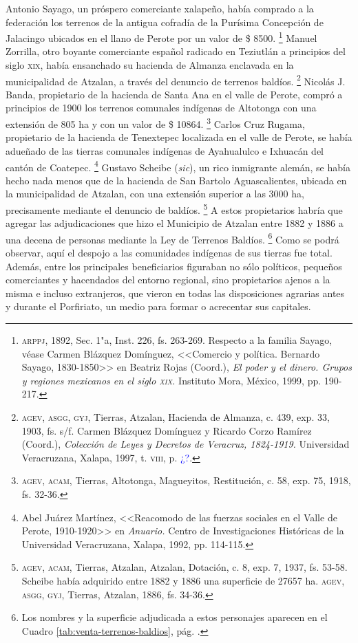 \documentclass[14pt,twoside,final]{extbook} %
\let\oldfootnote\footnote
\renewcommand\footnote[1]{%
\oldfootnote{\hspace{1mm}#1}}
\begin{document}
Antonio Sayago, un próspero comerciante xalapeño, había comprado a la federación los terrenos de la antigua cofradía de la Purísima Concepción de Jalacingo ubicados en el llano de Perote por un valor de \$ 8500.\footnote{\textsc{arppj}, 1892, Sec. 1"a, Inst. 226, fs. 263-269. Respecto a la familia Sayago, véase Carmen Blázquez Domínguez, <<Comercio y política. Bernardo Sayago, 1830-1850>> en Beatriz Rojas (Coord.), \emph{El poder y el dinero. Grupos y regiones mexicanos en el siglo \textsc{xix}.} Instituto Mora, México, 1999, pp. 190-217.} Manuel Zorrilla, otro
boyante comerciante español radicado en Teziutlán a principios del siglo \textsc{xix}, había ensanchado su hacienda de Almanza enclavada en la municipalidad de Atzalan, a través del denuncio de terrenos baldíos.\footnote{\textsc{agev, asgg, gyj}, Tierras, Atzalan, Hacienda de Almanza, c. 439, exp. 33, 1903, fs. s/f. Carmen Blázquez Domínguez y Ricardo Corzo Ramírez (Coord.), \emph{Colección de Leyes y Decretos de Veracruz, 1824-1919.} Universidad Veracruzana, Xalapa, 1997, t. \textsc{viii}, p. \textcolor{blue}{¿?}.} Nicolás J. Banda, propietario de la hacienda de Santa Ana en el valle de Perote, compró a principios de 1900 los terrenos comunales indígenas de Altotonga con una extensión de 805 ha y con un valor de \$ 10864.\footnote{\textsc{agev, acam}, Tierras, Altotonga, Magueyitos, Restitución, c. 58, exp. 75, 1918, fs. 32-36.} Carlos Cruz Rugama, propietario de la hacienda de Tenextepec localizada en el valle de Perote, se había adueñado de las tierras comunales indígenas de Ayahualulco e Ixhuacán del cantón de Coatepec.\footnote{Abel Juárez Martínez, <<Reacomodo de las fuerzas sociales en el Valle de Perote, 1910-1920>> en \textit{Anuario.} Centro de Investigaciones Históricas de la Universidad Veracruzana, Xalapa, 1992, pp. 114-115.} Gustavo Scheibe (\emph{sic}), un rico inmigrante alemán, se había hecho nada menos que de la hacienda de San Bartolo Aguascalientes, ubicada en la municipalidad de Atzalan, con una extensión superior a las 3000 ha, precisamente mediante el denuncio de baldíos.\footnote{\textsc{agev, acam}, Tierras, Atzalan, Atzalan, Dotación, c. 8, exp. 7, 1937, fs. 53-58. Scheibe había adquirido entre 1882 y 1886 una superficie de 27657 ha. \textsc{agev, asgg, gyj}, Tierras, Atzalan, 1886, fs. 34-36.} A estos propietarios habría que agregar las adjudicaciones que hizo el Municipio de Atzalan entre 1882 y 1886 a una decena de personas mediante la Ley de Terrenos Baldíos.\footnote{Los nombres y la superficie adjudicada a estos personajes aparecen en el Cuadro  \ref{tab:venta-terrenos-baldios}, pág. \pageref{tab:venta-terrenos-baldios}.} Como se podrá observar, aquí el despojo a las comunidades indígenas de sus tierras fue total. Además, entre los principales beneficiarios figuraban no sólo políticos, pequeños comerciantes y hacendados del entorno regional, sino propietarios ajenos a la misma e incluso extranjeros, que vieron en todas las disposiciones agrarias antes y durante el Porfiriato, un medio para formar o acrecentar sus capitales.
\end{document}

